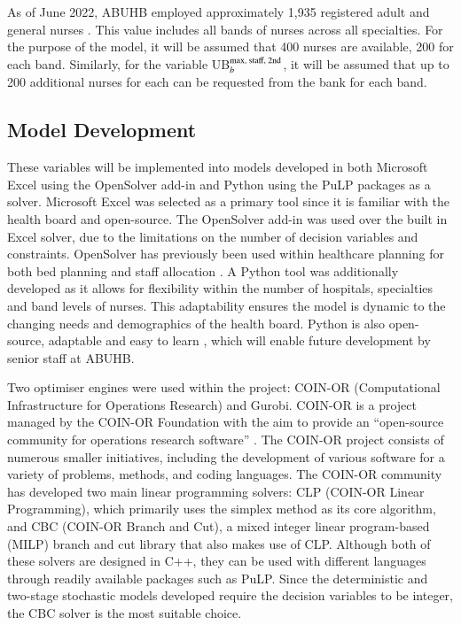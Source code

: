 \documentclass[../thesis.tex]{subfiles}
\begin{document}
As of June 2022, ABUHB employed approximately 1,935 registered adult and general nurses \cite{StatsWales2022}. This value includes all bands of nurses across all specialties. For the purpose of the model, it will be assumed that 400 nurses are available, 200 for each band. Similarly, for the variable UB$^\textnormal{max, staff, 2nd}_b$, it will be assumed that up to 200 additional nurses for each can be requested from the bank for each band.

\subsection{Model Development}
These variables will be implemented into models developed in both Microsoft Excel using the OpenSolver add-in and Python using the PuLP packages as a solver. Microsoft Excel was selected as a primary tool since it is familiar with the health board and open-source. The OpenSolver add-in was used over the built in Excel solver, due to the limitations on the number of decision variables and constraints. OpenSolver has previously been used within healthcare planning for both bed planning \cite{Lal2015} and staff allocation \cite{Respicio2018}. A Python tool was additionally developed as it allows for flexibility within the number of hospitals, specialties and band levels of nurses. This adaptability ensures the model is dynamic to the changing needs and demographics of the health board. Python is also open-source, adaptable and easy to learn \cite{Ranum2006}, which will enable future development by senior staff at ABUHB. 

Two optimiser engines were used within the project: COIN-OR (Computational Infrastructure for Operations Research) and Gurobi. COIN-OR is a project managed by the COIN-OR Foundation with the aim to provide an ``open-source community for operations research software'' \cite{COF2016, LougeeHeimer2003}. The COIN-OR project consists of numerous smaller initiatives, including the development of various software for a variety of problems, methods, and coding languages. The COIN-OR community has developed two main linear programming solvers: CLP (COIN-OR Linear Programming), which primarily uses the simplex method as its core algorithm, and CBC (COIN-OR Branch and Cut), a mixed integer linear program-based (MILP) branch and cut library that also makes use of CLP. Although both of these solvers are designed in C++, they can be used with different languages through readily available packages such as PuLP. Since the deterministic and two-stage stochastic models developed require the decision variables to be integer, the CBC solver is the most suitable choice.
\end{document}
